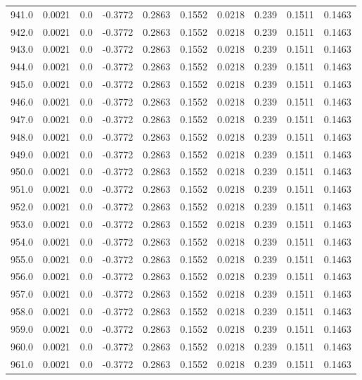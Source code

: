 \begin{longtable}{lrrrrrrrrr}
941.0 & 0.0021 & 0.0 & -0.3772 & 0.2863 & 0.1552 & 0.0218 & 0.239 & 0.1511 & 0.1463 \\
942.0 & 0.0021 & 0.0 & -0.3772 & 0.2863 & 0.1552 & 0.0218 & 0.239 & 0.1511 & 0.1463 \\
943.0 & 0.0021 & 0.0 & -0.3772 & 0.2863 & 0.1552 & 0.0218 & 0.239 & 0.1511 & 0.1463 \\
944.0 & 0.0021 & 0.0 & -0.3772 & 0.2863 & 0.1552 & 0.0218 & 0.239 & 0.1511 & 0.1463 \\
945.0 & 0.0021 & 0.0 & -0.3772 & 0.2863 & 0.1552 & 0.0218 & 0.239 & 0.1511 & 0.1463 \\
946.0 & 0.0021 & 0.0 & -0.3772 & 0.2863 & 0.1552 & 0.0218 & 0.239 & 0.1511 & 0.1463 \\
947.0 & 0.0021 & 0.0 & -0.3772 & 0.2863 & 0.1552 & 0.0218 & 0.239 & 0.1511 & 0.1463 \\
948.0 & 0.0021 & 0.0 & -0.3772 & 0.2863 & 0.1552 & 0.0218 & 0.239 & 0.1511 & 0.1463 \\
949.0 & 0.0021 & 0.0 & -0.3772 & 0.2863 & 0.1552 & 0.0218 & 0.239 & 0.1511 & 0.1463 \\
950.0 & 0.0021 & 0.0 & -0.3772 & 0.2863 & 0.1552 & 0.0218 & 0.239 & 0.1511 & 0.1463 \\
951.0 & 0.0021 & 0.0 & -0.3772 & 0.2863 & 0.1552 & 0.0218 & 0.239 & 0.1511 & 0.1463 \\
952.0 & 0.0021 & 0.0 & -0.3772 & 0.2863 & 0.1552 & 0.0218 & 0.239 & 0.1511 & 0.1463 \\
953.0 & 0.0021 & 0.0 & -0.3772 & 0.2863 & 0.1552 & 0.0218 & 0.239 & 0.1511 & 0.1463 \\
954.0 & 0.0021 & 0.0 & -0.3772 & 0.2863 & 0.1552 & 0.0218 & 0.239 & 0.1511 & 0.1463 \\
955.0 & 0.0021 & 0.0 & -0.3772 & 0.2863 & 0.1552 & 0.0218 & 0.239 & 0.1511 & 0.1463 \\
956.0 & 0.0021 & 0.0 & -0.3772 & 0.2863 & 0.1552 & 0.0218 & 0.239 & 0.1511 & 0.1463 \\
957.0 & 0.0021 & 0.0 & -0.3772 & 0.2863 & 0.1552 & 0.0218 & 0.239 & 0.1511 & 0.1463 \\
958.0 & 0.0021 & 0.0 & -0.3772 & 0.2863 & 0.1552 & 0.0218 & 0.239 & 0.1511 & 0.1463 \\
959.0 & 0.0021 & 0.0 & -0.3772 & 0.2863 & 0.1552 & 0.0218 & 0.239 & 0.1511 & 0.1463 \\
960.0 & 0.0021 & 0.0 & -0.3772 & 0.2863 & 0.1552 & 0.0218 & 0.239 & 0.1511 & 0.1463 \\
961.0 & 0.0021 & 0.0 & -0.3772 & 0.2863 & 0.1552 & 0.0218 & 0.239 & 0.1511 & 0.1463 \\

\end{longtable}
